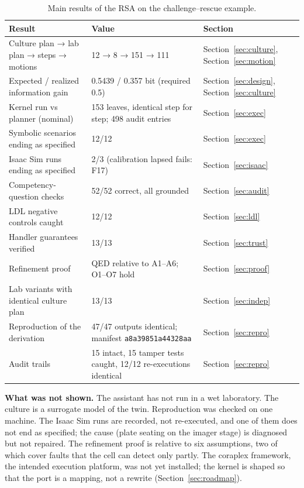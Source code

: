 \documentclass[10pt,a4paper]{article}
\begin{document}
\begin{table}[tbp]\centering\small
\caption{Main results of the RSA on the challenge–rescue example.}\label{tab:key}
\begin{tabularx}{\linewidth}{XXp{3.2cm}}\toprule
\textbf{Result} & \textbf{Value} & \textbf{Section} \\\midrule
Culture plan → lab plan → steps → motions & 12 → 8 → 151 → 111 & Section~\ref{sec:culture}, Section~\ref{sec:motion} \\
Expected / realized information gain & 0.5439 / 0.357 bit (required 0.5) & Section~\ref{sec:design}, Section~\ref{sec:culture} \\
Kernel run vs planner (nominal) & 153 leaves, identical step for step; 498 audit entries & Section~\ref{sec:exec} \\
Symbolic scenarios ending as specified & 12/12 & Section~\ref{sec:exec} \\
Isaac Sim runs ending as specified & 2/3 (calibration lapsed fails: F17) & Section~\ref{sec:isaac} \\
Competency-question checks & 52/52 correct, all grounded & Section~\ref{sec:audit} \\
LDL negative controls caught & 12/12 & Section~\ref{sec:ldl} \\
Handler guarantees verified & 13/13 & Section~\ref{sec:trust} \\
Refinement proof & QED relative to A1–A6; O1–O7 hold & Section~\ref{sec:proof} \\
Lab variants with identical culture plan & 13/13 & Section~\ref{sec:indep} \\
Reproduction of the derivation & 47/47 outputs identical; manifest \texttt{a8a39851a44328aa} & Section~\ref{sec:repro} \\
Audit trails & 15 intact, 15 tamper tests caught, 12/12 re-executions identical & Section~\ref{sec:repro} \\\bottomrule
\end{tabularx}
\end{table}

\textbf{What was not shown.} The assistant has not run in a wet laboratory. The culture is a surrogate model of the twin. Reproduction was checked on one machine. The Isaac Sim runs are recorded, not re-executed, and one of them does not end as specified; the cause (plate seating on the imager stage) is diagnosed but not repaired. The refinement proof is relative to six assumptions, two of which cover faults that the cell can detect only partly. The coraplex framework, the intended execution platform, was not yet installed; the kernel is shaped so that the port is a mapping, not a rewrite (Section~\ref{sec:roadmap}).
\end{document}
